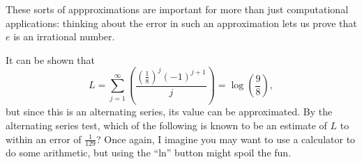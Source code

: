 \documentclass{ximera}
\begin{document}
These sorts of appproximations are important for more than just
computational applications: thinking about the error in such an
approximation lets us prove that \(e\) is an irrational number.


\begin{question}
  It can be shown that \[L = \displaystyle\sum_{j=1}^\infty \left( \displaystyle\frac{\left(\displaystyle\frac{1}{8}\right)^{j} \left(-1\right)^{j + 1}}{j} \right) = \log\left(\displaystyle\frac{9}{8}\right),\] but since this is an alternating series, its value can be approximated.  By the alternating series test, which of the following is known to be an estimate of \(L\) to within an error of \(\displaystyle\frac{1}{129}\)?  Once again, I imagine you may want to use a calculator to do some arithmetic, but using the ``ln'' button might spoil the fun.


\end{question}
\end{document}

